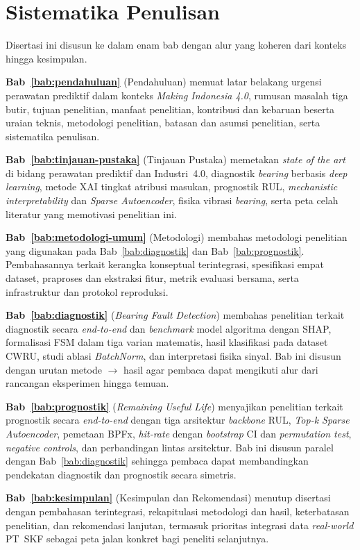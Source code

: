 \section{Sistematika Penulisan}
\label{sec:bab1_sistematika}

Disertasi ini disusun ke dalam enam bab dengan alur yang koheren dari
konteks hingga kesimpulan.

\textbf{Bab~\ref{bab:pendahuluan}} (Pendahuluan) memuat latar belakang
urgensi perawatan prediktif dalam konteks \emph{Making Indonesia 4.0},
{\color{blue}rumusan masalah tiga butir, tujuan penelitian, manfaat
penelitian}, kontribusi dan kebaruan beserta uraian teknis, metodologi
penelitian, batasan dan asumsi penelitian, serta sistematika penulisan.

\textbf{Bab~\ref{bab:tinjauan-pustaka}} (Tinjauan Pustaka) memetakan
\emph{state of the art} di bidang perawatan prediktif dan Industri~4.0,
diagnostik \emph{bearing} berbasis \emph{deep learning}, metode XAI
tingkat atribusi masukan, prognostik RUL, \emph{mechanistic
interpretability} dan \emph{Sparse Autoencoder}, fisika vibrasi
\emph{bearing}, serta peta celah literatur yang memotivasi penelitian ini.

\textbf{Bab~{\color{blue}\ref{bab:metodologi-umum}}} (Metodologi) membahas metodologi penelitian yang digunakan pada
 Bab~{\color{blue}\ref{bab:diagnostik}} dan Bab~{\color{blue}\ref{bab:prognostik}}. Pembahasannya terkait kerangka konseptual terintegrasi, spesifikasi
empat dataset, praproses dan ekstraksi fitur, metrik evaluasi bersama,
serta infrastruktur dan protokol reproduksi.

\textbf{Bab~{\color{blue}\ref{bab:diagnostik}}} (\emph{Bearing Fault Detection})
membahas penelitian terkait {\color{blue}diagnostik} secara \emph{end-to-end} dan \emph{benchmark}
model algoritma dengan SHAP, formalisasi FSM dalam tiga
varian matematis, hasil klasifikasi pada dataset CWRU, studi ablasi
\emph{BatchNorm}, dan interpretasi fisika sinyal.
Bab ini disusun dengan urutan metode $\rightarrow$ hasil agar pembaca
dapat mengikuti alur dari rancangan eksperimen hingga temuan.

\textbf{Bab~{\color{blue}\ref{bab:prognostik}}} (\emph{Remaining Useful Life})
menyajikan penelitian terkait {\color{blue} prognostik} secara \emph{end-to-end} dengan tiga arsitektur
\emph{backbone} RUL, \emph{Top-k Sparse Autoencoder}, pemetaan BPFx,
\emph{hit-rate} dengan \emph{bootstrap} CI dan \emph{permutation test},
\emph{negative controls}, dan perbandingan lintas arsitektur.
Bab ini disusun paralel dengan Bab~{\color{blue}\ref{bab:diagnostik}} sehingga pembaca dapat
membandingkan pendekatan diagnostik dan prognostik secara simetris.

\textbf{Bab~\ref{bab:kesimpulan}} (Kesimpulan dan Rekomendasi) menutup
disertasi dengan pembahasan terintegrasi, rekapitulasi metodologi dan hasil, keterbatasan penelitian, dan
rekomendasi lanjutan, termasuk prioritas integrasi data \emph{real-world}
PT~SKF sebagai peta jalan konkret bagi peneliti selanjutnya.
